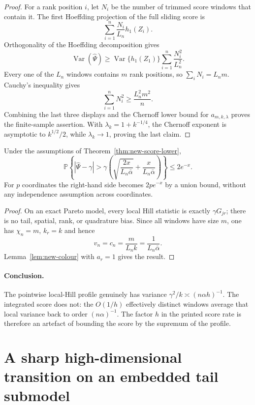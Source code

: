 \begin{proof}
For a rank position $i$, let $N_i$ be the number of trimmed score windows
that contain it. The first Hoeffding projection of the full sliding score
is
\[
 \sum_{i=1}^n\frac{N_i}{L_n}h_1(Z_i).
\]
Orthogonality of the Hoeffding decomposition gives
\[
 \operatorname{Var}(\widehat\Psi)
 \ge \operatorname{Var}\{h_1(Z_1)\}
       \sum_{i=1}^n\frac{N_i^2}{L_n^2}.
\]
Every one of the $L_n$ windows contains $m$ rank positions, so
$\sum_iN_i=L_nm$. Cauchy's inequality gives
\[
 \sum_{i=1}^nN_i^2\ge\frac{L_n^2m^2}{n}.
\]
Combining the last three displays and the Chernoff lower bound for
$a_{m,k,\lambda}$ proves the finite-sample assertion. With
$\lambda_k=1+k^{-1/4}$, the Chernoff exponent is asymptotic to
$k^{1/2}/2$, while $\lambda_k\to1$, proving the last claim.
\end{proof}

\begin{proposition}
\label{prop:new-pareto-upper}
Under the assumptions of Theorem~\ref{thm:new-score-lower},
\[
 \mathbb P\left\{
 |\widehat\Psi-\gamma|>
 \gamma\left(
  \sqrt{\frac{2x}{L_n\bar\alpha}}
  +\frac{x}{L_n\bar\alpha}
 \right)\right\}\le2e^{-x}.
\]
For $p$ coordinates the right-hand side becomes $2pe^{-x}$ by a union
bound, without any independence assumption across coordinates.
\end{proposition}

\begin{proof}
On an exact Pareto model, every local Hill statistic is exactly
$\gamma G_{jr}$; there is no tail, spatial, rank, or quadrature bias. Since
all windows have size $m$, one has $\chi_n=m$, $k_r=k$ and hence
\[
 v_n=c_n=\frac{m}{L_nk}=\frac1{L_n\bar\alpha}.
\]
Lemma~\ref{lem:new-colour} with $a_r=1$ gives the result.
\end{proof}

\paragraph{Conclusion.}
The pointwise local-Hill profile genuinely has variance
$\gamma^2/k\asymp(n\alpha h)^{-1}$. The integrated score does not: the
$O(1/h)$ effectively distinct windows average that local variance back to
order $(n\alpha)^{-1}$. The factor $h$ in the printed score rate is
therefore an artefact of bounding the score by the supremum of the profile.

\section{A sharp high-dimensional transition on an embedded tail submodel}
\label{sec:new-fano}

